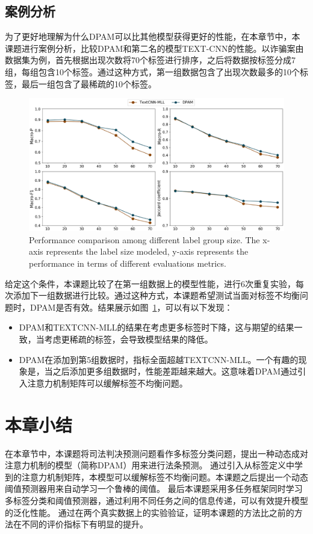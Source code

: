 \subsection{案例分析}
为了更好地理解为什么DPAM可以比其他模型获得更好的性能，在本章节中，本课题进行案例分析，比较DPAM和第二名的模型TEXT-CNN的性能。以诈骗案由数据集为例，首先根据出现次数将70个标签进行排序，之后将数据按标签分成7组，每组包含10个标签。通过这种方式，第一组数据包含了出现次数最多的10个标签，最后一组包含了最稀疏的10个标签。

\begin{figure}[htbp]%
\centering
\includegraphics[scale=0.30, clip=true]{./sources/comL.eps}
\caption{\label{fig:comL}Performance comparison among different label group size. The x-axis represents the label size modeled, y-axis represents the performance in terms of different evaluations metrics.
}
\end{figure}

给定这个条件，本课题比较了在第一组数据上的模型性能，进行6次重复实验，每次添加下一组数据进行比较。通过这种方式，本课题希望测试当面对标签不均衡问题时，DPAM是否有效。结果展示如图~\ref{fig:comL}，可以有以下发现：
\begin{itemize}
    \item DPAM和TEXTCNN-MLL的结果在考虑更多标签时下降，这与期望的结果一致，当考虑更稀疏的标签，会导致模型结果的降低。
    \item DPAM在添加到第5组数据时，指标全面超越TEXTCNN-MLL。一个有趣的现象是，当之后添加更多组数据时，性能差距越来越大。这意味着DPAM通过引入注意力机制矩阵可以缓解标签不均衡问题。
\end{itemize}

\section{本章小结}
\label{sec:dpam_conclu}
在本章节中，本课题将司法判决预测问题看作多标签分类问题，提出一种动态成对注意力机制的模型（简称DPAM）用来进行法条预测。
通过引入从标签定义中学到的注意力机制矩阵，本模型可以缓解标签不均衡问题。本课题之后提出一个动态阈值预测器用来自动学习一个鲁棒的阈值。
最后本课题采用多任务框架同时学习多标签分类和阈值预测器，通过利用不同任务之间的信息传递，可以有效提升模型的泛化性能。
通过在两个真实数据上的实验验证，证明本课题的方法比之前的方法在不同的评价指标下有明显的提升。
